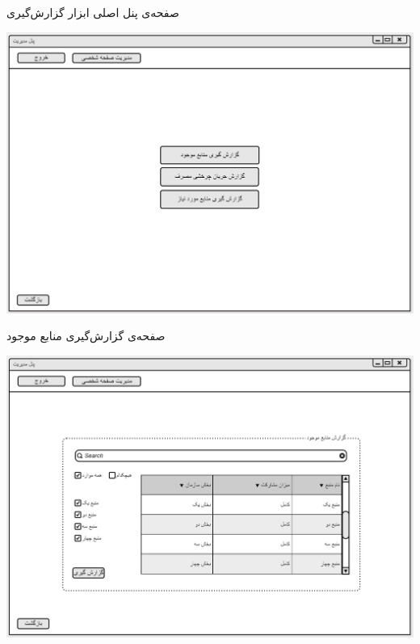 \documentclass{article}
\begin{document}
\vspace{1cm}
صفحه‌ی پنل اصلی ابزار گزارش‌گیری
\begin{center}
\includegraphics[width=\textwidth]{Prototype/Reporting/ReportHomePage.png}
\end{center}

\newpage
\vspace{1cm}
صفحه‌ی گزارش‌گیری منابع موجود
\begin{center}
\includegraphics[width=\textwidth]{Prototype/Reporting/ResourceReport.png}
\end{center}
\end{document}
